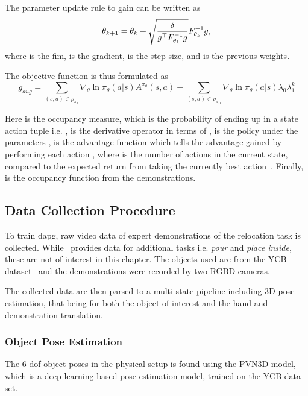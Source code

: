 The parameter update rule to gain  can be written as
%
\begin{equation}
    \theta_{k+1} = \theta_k + \sqrt{\frac{\delta}{g^\top F^{-1}_{\theta_k}g}}F^{-1}_{\theta_k}g,
\end{equation}
where  is the \gls{fim},  is the gradient, \mvar{\delta} is the step size, and  is the previous weights.\medskip

The objective function is thus formulated as 
%
\begin{equation}\label{eq:dapg}
    g_{aug} = \sum_{(s,a)\in\rho_{\pi_\theta}}\nabla_\theta \ln \pi_\theta(a|s)A^{\pi_\theta}(s,a) + \sum_{(s,a)\in\rho_{\pi_D}} \nabla_\theta \ln \pi_\theta(a|s) \lambda_0 \lambda_1^k
\end{equation}

Here \mvar{\rho_{\pi_\theta}} is the occupancy measure, which is the probability of ending up in a state action tuple i.e. , \mvar{\nabla_\theta} is the derivative operator in terms of \mvar{\theta}, \mvar{\pi_\theta} is the policy under the parameters \mvar{\theta},  is the advantage function which tells the advantage gained by performing each action , where  is the number of actions in the current state, compared to the expected return from taking the currently best action~\cite{advantage-updating}. Finally,  is the occupancy function from the demonstrations.

\subsection{Data Collection Procedure}
To train \gls{dapg}, raw video data of expert demonstrations of the relocation task is collected. While~\cite{dexmv:-imitation-learning-for-dexterous-manipulation-from-human-videos} provides data for additional tasks i.e. \textit{pour} and \textit{place inside}, these are not of interest in this chapter. The objects used are from the YCB dataset~\cite{ycb} and the demonstrations were recorded by two RGBD cameras.\medskip

The collected data are then parsed to a multi-state pipeline including 3D pose estimation, that being for both the object of interest and the hand and demonstration translation.

\subsubsection{Object Pose Estimation}
The \num{6}-\gls{dof} object poses in the physical setup is found using the PVN3D model, which is a deep learning-based pose estimation model, trained on the YCB data set.\medskip

